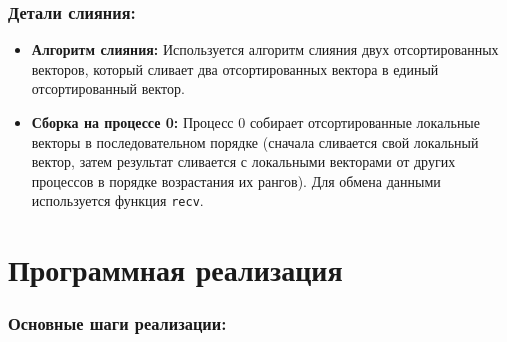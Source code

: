 \documentclass[12pt]{article}
\begin{document}
\subsubsection*{Детали слияния:}
\begin{itemize}
    \item \textbf{Алгоритм слияния:} Используется алгоритм слияния двух отсортированных векторов, который сливает два отсортированных вектора в единый отсортированный вектор.
    \item \textbf{Сборка на процессе 0:} Процесс 0 собирает отсортированные локальные векторы в последовательном порядке (сначала сливается свой локальный вектор, затем результат сливается с локальными векторами от других процессов в порядке возрастания их рангов). Для обмена данными используется функция \texttt{recv}.
\end{itemize}

\section{Программная реализация}

\subsubsection*{Основные шаги реализации:}
\end{document}
